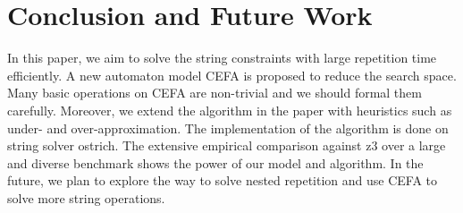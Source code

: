 \documentclass[sigconf]{acmart}
\begin{document}
\section{Conclusion and Future Work} \label{sec:conclu}
In this paper, we aim to solve the string constraints with large repetition time efficiently. A new automaton model CEFA is proposed to reduce the search space. Many basic operations on CEFA are non-trivial and we should formal them carefully. Moreover, we extend the algorithm in the paper \cite{atva2020} with heuristics such as under- and over-approximation. The implementation of the algorithm is done on string solver ostrich. The extensive empirical comparison against z3 over a large and diverse benchmark shows the power of our model and algorithm. In the future, we plan to explore the way to solve nested repetition and use CEFA to solve more string operations.



\end{document}
